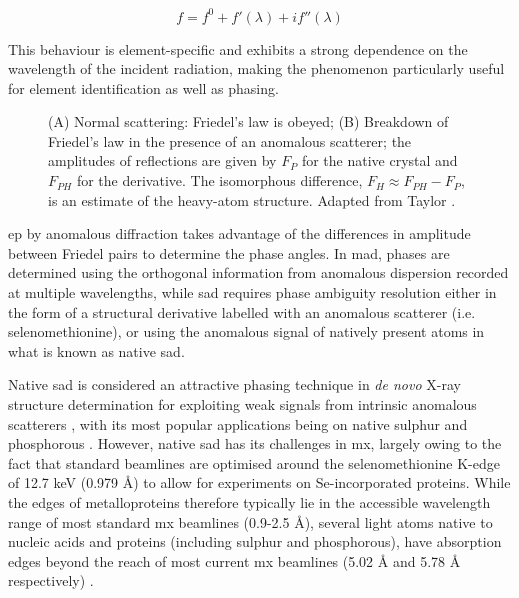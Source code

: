 \begin{equation}
    f=f^0+f'(\lambda)+if''(\lambda) \label{total scattering}
\end{equation}

This behaviour is element-specific and exhibits a strong dependence on the wavelength of the incident radiation, making the phenomenon particularly useful for element identification as well as phasing.

\begin{figure}
    \centering
    
    \caption{(A) Normal scattering: Friedel's law is obeyed; (B) Breakdown of Friedel's law in the presence of an anomalous scatterer; the amplitudes of reflections are given by $F_P$ for the native crystal and $F_{PH}$ for the derivative. The isomorphous difference, $F_H \approx F_{PH} - F_P$, is an estimate of the heavy-atom structure. Adapted from Taylor \cite{Taylor2003}.}
    \label{Breakdown of Friedel's law}
\end{figure}

\ac{ep} by anomalous diffraction takes advantage of the differences in amplitude between Friedel pairs to determine the phase angles. In \ac{mad}, phases are determined using the orthogonal information from anomalous dispersion recorded at multiple wavelengths, while \ac{sad} requires phase ambiguity resolution either in the form of a structural derivative labelled with an anomalous scatterer (i.e. selenomethionine), or using the anomalous signal of  natively present atoms in what is known as native \ac{sad}.

Native \ac{sad} is considered an attractive phasing technique in  \textit{de novo} X-ray structure determination %
for exploiting weak signals from intrinsic anomalous scatterers \cite{Basu2019}, with its most popular applications being on native sulphur and phosphorous \cite{Karasawa2022}. However, native \ac{sad} has its challenges in \ac{mx}, largely owing to the fact that standard beamlines are optimised around the selenomethionine K-edge of 12.7 keV (0.979 Å) to allow for experiments on Se-incorporated proteins.
While the edges of metalloproteins therefore typically lie in the accessible wavelength range of most standard \ac{mx} beamlines (0.9-2.5 Å), several light atoms native to nucleic acids and proteins (including sulphur and phosphorous), have absorption edges beyond the reach of most current \ac{mx} beamlines (5.02 Å and 5.78 Å respectively) \cite{Olieric2016}. 


